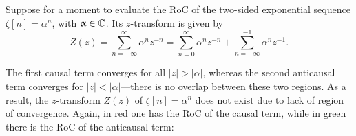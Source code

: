 \documentclass[\documentfontsize, twocolumn]{\classname}
\begin{document}
\begin{description}
Suppose for a moment to evaluate the RoC of the two-sided exponential sequence $\zeta[n] = \alpha^n$, with $\upalpha \in \mathbb C$. Its $z$-transform is given by
\begin{equation}\label{eqn:zTransformTwoSidedExponential}
    Z(z) = \sum_{n=-\infty}^\infty \alpha^n z^{-n} = \sum_{n=0}^\infty \alpha^n z^{-n} + \sum_{n=-\infty}^{-1} \alpha^n z^{-1}.
\end{equation}

The first causal term converges for all $|z| > |\alpha|$, whereas the second anticausal term converges for $|z| < |\alpha|$---there is no overlap between these two regions. As a result, the $z$-transform $Z(z)$ of $\zeta[n] =\alpha^n$ does not exist due to lack of region of convergence. Again, in red one has the RoC of the causal term, while in green there is the RoC of the anticausal term:
\begin{center}
\end{center}

\end{description}
\end{document}
